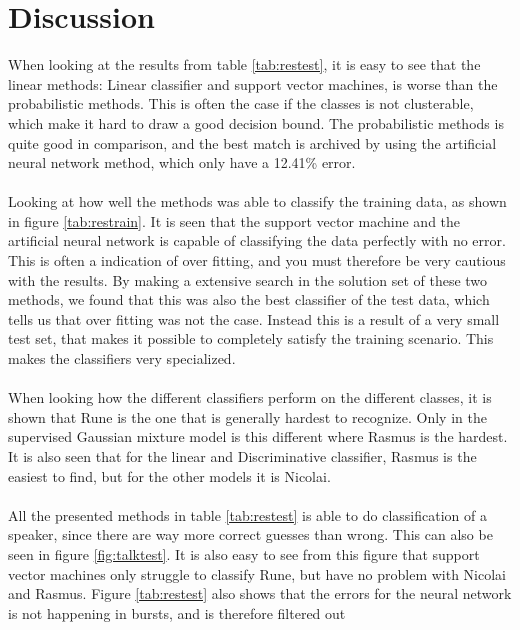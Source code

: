 \section{Discussion}
When looking at the results from table \ref{tab:restest}, it is easy to see that the linear methods: Linear classifier and support vector machines, is worse than the probabilistic methods. This is often the case if the classes is not clusterable, which make it hard to draw a good decision bound. The probabilistic methods is quite good in comparison, and the best match is archived by using the artificial neural network method, which only have a 12.41\% error. \\\ \\

Looking at how well the methods was able to classify the training data, as shown in figure \ref{tab:restrain}. It is seen that the support vector machine and the artificial neural network is capable of classifying the data perfectly with no error. This is often a indication of over fitting, and you must therefore be very cautious with the results. By making a extensive search in the solution set of these two methods, we found that this was also the best classifier of the test data, which tells us that over fitting was not the case. Instead this is a result of a very small test set, that makes it possible to completely satisfy the training scenario. This makes the classifiers very specialized. \\\ \\


When looking how the different classifiers perform on the different classes, it is shown that Rune is the one that is generally hardest to recognize. Only in the supervised Gaussian mixture model is this different where Rasmus is the hardest.  It is also seen that for the linear and Discriminative classifier, Rasmus is the easiest to find, but for the other models it is Nicolai. \\\ \\

All the presented methods in table \ref{tab:restest} is able to do classification of a speaker, since there are way more correct guesses than wrong. This can also be seen in figure \ref{fig:talktest}. It is also easy to see from this figure that support vector machines only struggle to classify Rune, but have no problem with Nicolai and Rasmus. Figure \ref{tab:restest} also shows that the errors for the neural network is not happening in bursts, and is therefore filtered out \\\ \\

